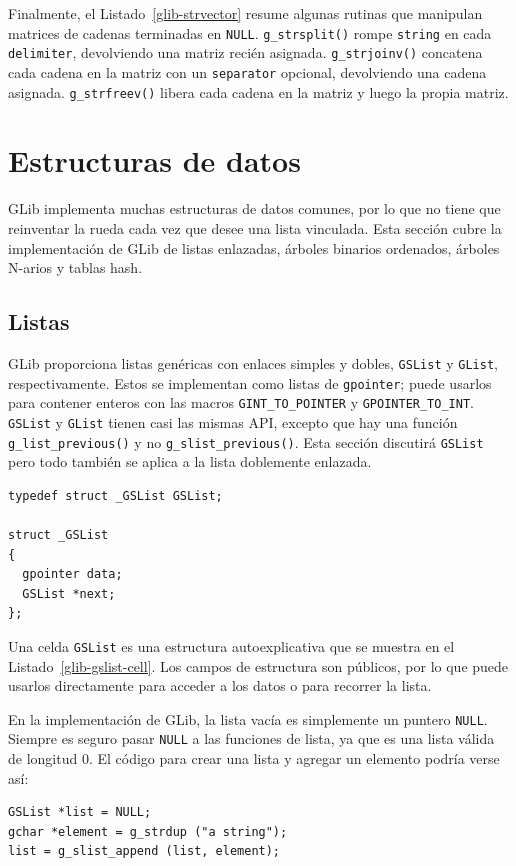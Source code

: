 Finalmente, el Listado~\ref{glib-strvector} resume algunas rutinas que manipulan matrices de cadenas terminadas en \lstinline{NULL}. \lstinline{g_strsplit()} rompe \lstinline{string} en cada \lstinline{delimiter}, devolviendo una matriz recién asignada. \lstinline{g_strjoinv()} concatena cada cadena en la matriz con un \lstinline{separator} opcional, devolviendo una cadena asignada. \lstinline{g_strfreev()} libera cada cadena en la matriz y luego la propia matriz.

\section{Estructuras de datos}

GLib implementa muchas estructuras de datos comunes, por lo que no tiene que reinventar la rueda cada vez que desee una lista vinculada. Esta sección cubre la implementación de GLib de listas enlazadas, árboles binarios ordenados, árboles N-arios y tablas hash.

\subsection{Listas}

GLib proporciona listas genéricas con enlaces simples y dobles, \lstinline{GSList} y \lstinline{GList}, respectivamente. Estos se implementan como listas de \lstinline{gpointer}; puede usarlos para contener enteros con las macros \lstinline{GINT_TO_POINTER} y \lstinline{GPOINTER_TO_INT}. \lstinline{GSList} y \lstinline{GList} tienen casi las mismas API, excepto que hay una función \lstinline{g_list_previous()} y no \lstinline{g_slist_previous()}. Esta sección discutirá \lstinline{GSList} pero todo también se aplica a la lista doblemente enlazada.

\begin{lstlisting}[float, caption={Celda \lstinline{GSList}}, label=glib-gslist-cell]
typedef struct _GSList GSList;

struct _GSList
{
  gpointer data;
  GSList *next;
};
\end{lstlisting}

Una celda \lstinline{GSList} es una estructura autoexplicativa que se muestra en el Listado~\ref{glib-gslist-cell}. Los campos de estructura son públicos, por lo que puede usarlos directamente para acceder a los datos o para recorrer la lista.

En la implementación de GLib, la lista vacía es simplemente un puntero \lstinline{NULL}. Siempre es seguro pasar \lstinline{NULL} a las funciones de lista, ya que es una lista válida de longitud 0. El código para crear una lista y agregar un elemento podría verse así:
\begin{lstlisting}
GSList *list = NULL;
gchar *element = g_strdup ("a string");
list = g_slist_append (list, element);
\end{lstlisting}

